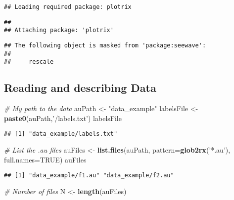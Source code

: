 \documentclass[]{article}
\newenvironment{Shaded}{\begin{snugshade}}{\end{snugshade}}
\newcommand{\KeywordTok}[1]{\textcolor[rgb]{0.13,0.29,0.53}{\textbf{#1}}}
\newcommand{\DataTypeTok}[1]{\textcolor[rgb]{0.13,0.29,0.53}{#1}}
\newcommand{\StringTok}[1]{\textcolor[rgb]{0.31,0.60,0.02}{#1}}
\newcommand{\CommentTok}[1]{\textcolor[rgb]{0.56,0.35,0.01}{\textit{#1}}}
\newcommand{\OtherTok}[1]{\textcolor[rgb]{0.56,0.35,0.01}{#1}}
\newcommand{\NormalTok}[1]{#1}
\begin{document}
\begin{verbatim}
## Loading required package: plotrix
\end{verbatim}

\begin{verbatim}
## 
## Attaching package: 'plotrix'
\end{verbatim}

\begin{verbatim}
## The following object is masked from 'package:seewave':
## 
##     rescale
\end{verbatim}

\subsection{Reading and describing
Data}\label{reading-and-describing-data}

\begin{Shaded}
\begin{Highlighting}[]
\CommentTok{# My path to the data }
\NormalTok{auPath <-}\StringTok{ "data_example"}
\NormalTok{labelsFile <-}\StringTok{ }\KeywordTok{paste0}\NormalTok{(auPath,}\StringTok{'/labels.txt'}\NormalTok{)}
\NormalTok{labelsFile}
\end{Highlighting}
\end{Shaded}

\begin{verbatim}
## [1] "data_example/labels.txt"
\end{verbatim}

\begin{Shaded}
\begin{Highlighting}[]
\CommentTok{# List the .au files}
\NormalTok{auFiles <-}\StringTok{ }\KeywordTok{list.files}\NormalTok{(auPath, }\DataTypeTok{pattern=}\KeywordTok{glob2rx}\NormalTok{(}\StringTok{'*.au'}\NormalTok{), }\DataTypeTok{full.names=}\OtherTok{TRUE}\NormalTok{)}
\NormalTok{auFiles}
\end{Highlighting}
\end{Shaded}

\begin{verbatim}
## [1] "data_example/f1.au" "data_example/f2.au"
\end{verbatim}

\begin{Shaded}
\begin{Highlighting}[]
\CommentTok{# Number of files }
\NormalTok{N <-}\StringTok{ }\KeywordTok{length}\NormalTok{(auFiles)}
\end{Highlighting}
\end{Shaded}
\end{document}

